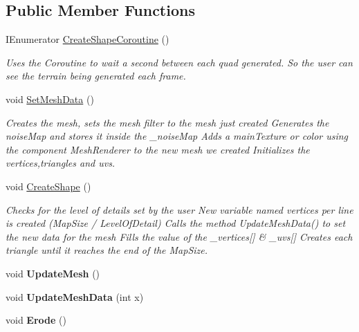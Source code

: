 \subsection*{Public Member Functions}
\begin{DoxyCompactItemize}
\item 
I\+Enumerator \mbox{\hyperlink{class_assets_1_1_scripts_1_1_mesh_generation_a533ee7b8be835fa3b6f6282e86fd9ec6}{Create\+Shape\+Coroutine}} ()
\begin{DoxyCompactList}\small\item\em Uses the Coroutine to wait a second between each quad generated. So the user can see the terrain being generated each frame. \end{DoxyCompactList}\item 
void \mbox{\hyperlink{class_assets_1_1_scripts_1_1_mesh_generation_a132027f38358668e6f8c320b00ee9327}{Set\+Mesh\+Data}} ()
\begin{DoxyCompactList}\small\item\em Creates the mesh, sets the mesh filter to the mesh just created Generates the noise\+Map and stores it inside the \+\_\+noise\+Map Adds a main\+Texture or color using the component Mesh\+Renderer to the new mesh we created Initializes the vertices,triangles and uvs. \end{DoxyCompactList}\item 
void \mbox{\hyperlink{class_assets_1_1_scripts_1_1_mesh_generation_aebf4b5f0cb1285927d7c44a03e98d78c}{Create\+Shape}} ()
\begin{DoxyCompactList}\small\item\em Checks for the level of details set by the user New variable named vertices per line is created (Map\+Size / Level\+Of\+Detail) Calls the method Update\+Mesh\+Data() to set the new data for the mesh Fills the value of the \+\_\+vertices\mbox{[}\mbox{]} \& \+\_\+uvs\mbox{[}\mbox{]} Creates each triangle until it reaches the end of the Map\+Size. \end{DoxyCompactList}\item 
\mbox{\label{class_assets_1_1_scripts_1_1_mesh_generation_a41a4e7a75db511109f7837f1f0fa376b}} 
void {\bfseries Update\+Mesh} ()
\item 
\mbox{\label{class_assets_1_1_scripts_1_1_mesh_generation_abaeb22e0f390a218be5d9543138f52b9}} 
void {\bfseries Update\+Mesh\+Data} (int x)
\item 
\mbox{\label{class_assets_1_1_scripts_1_1_mesh_generation_a4ca64ff2f5c1b7f9073699905628e6dd}} 
void {\bfseries Erode} ()
\end{DoxyCompactItemize}
